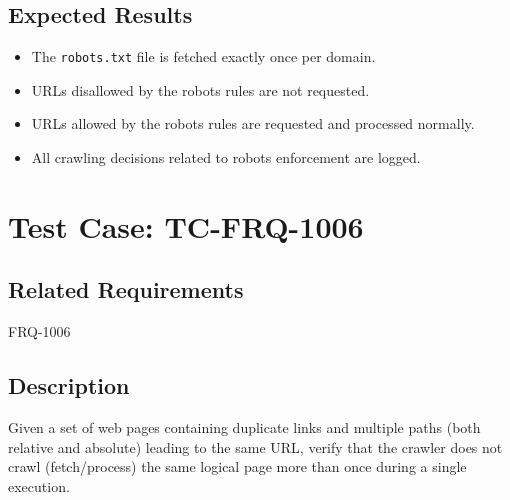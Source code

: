 \documentclass{article}
\begin{document}
\subsection*{Expected Results}
\begin{itemize}
  \item The \texttt{robots.txt} file is fetched exactly once per domain.
  \item URLs disallowed by the robots rules are not requested.
  \item URLs allowed by the robots rules are requested and processed normally.
  \item All crawling decisions related to robots enforcement are logged.
\end{itemize}



\section{Test Case: TC-FRQ-1006}

\subsection*{Related Requirements}
FRQ-1006

\subsection*{Description}
Given a set of web pages containing duplicate links and multiple paths (both relative and absolute) leading to the same URL, verify that the crawler does not crawl (fetch/process) the same logical page more than once during a single execution.
\end{document}
